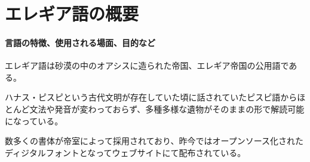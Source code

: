 \section{エレギア語の概要}
\label{sec:1}

\paragraph*{言語の特徴、使用される場面、目的など}

エレギア語は砂漠の中のオアシスに造られた帝国、エレギア帝国の公用語である。

ハナス・ピスピという古代文明が存在していた頃に話されていたピスピ語からほとんど文法や発音が変わっておらず、多種多様な遺物がそのままの形で解読可能になっている。

数多くの書体が帝室によって採用されており、昨今ではオープンソース化されたディジタルフォントとなってウェブサイトにて配布されている。
